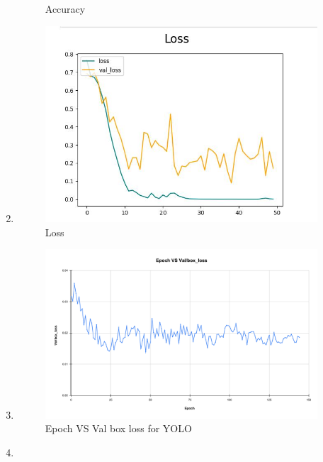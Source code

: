 \begin{enumerate}
\begin{figure}[H]
\begin{center}
	 \caption{Accuracy} %
	\label{figSample1} %
\end{center}
\end{figure}
\item 
\begin{figure}[H] %
\begin{center}
	\includegraphics[width = 4in]{images/loss.jpg}
	 \caption{Loss} %
	\label{figSample1} %
\end{center}
\end{figure}
\item 
\begin{figure}[H] %
\begin{center}
	\includegraphics[width = 4in]{images/Epoch VS Val_box_loss.pdf}
	 \caption{Epoch VS Val box loss for YOLO} %
	\label{figSample1} %
\end{center}
\end{figure}
\item 
\begin{figure}[H] %

\end{figure}
\end{enumerate}
